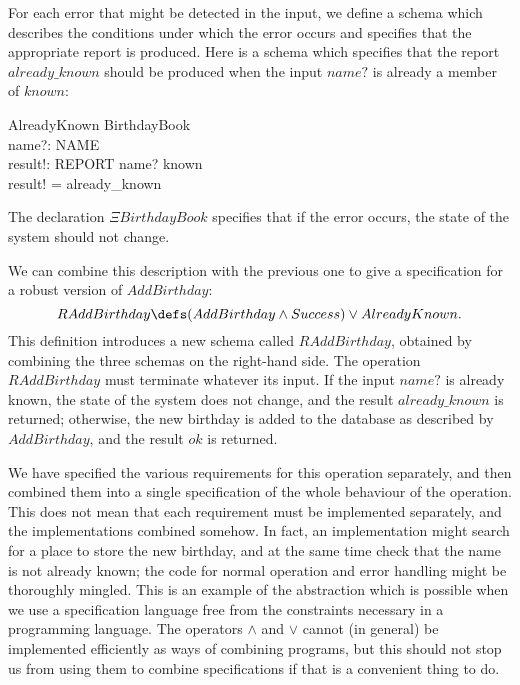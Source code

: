 \documentclass{llncs}
\begin{document}
For each error that might be detected in the input, we define a schema
which describes the conditions under which the error occurs and
specifies that the appropriate report is produced. Here is a schema
which specifies that the report $already\_known$ should be produced
when the input $name?$ is already a member of $known$:
\begin{schema}{AlreadyKnown}
	\Xi BirthdayBook \\
	name?: NAME \\
	result!: REPORT
\where
	name? \in known \\
	result! = already\_known
\end{schema}
The declaration $\Xi BirthdayBook$ specifies that if the error occurs,
the state of the system should not change.

We can combine this description with the previous one to give a
specification for a robust version of $AddBirthday$:
\[ RAddBirthday \defs (AddBirthday \land Success) \lor AlreadyKnown. \]
This definition introduces a new schema called $RAddBirthday$,
obtained by combining the three schemas on the right-hand side.
The operation $RAddBirthday$ must terminate whatever its input.  If
the input $name?$ is already known, the state of the system does not
change, and the result $already\_known$ is returned; otherwise,
the new birthday is added to the database as described by
$AddBirthday$, and the result $ok$ is returned.

We have specified the various requirements for this operation separately,
and then combined them into a single specification of the whole
behaviour of the operation. This does not mean that each requirement
must be implemented separately, and the implementations combined
somehow.
In fact, an implementation might search for a place to store the new
birthday, and at the same time check that the name is not already known;
the code for normal operation and error handling might be thoroughly
mingled.
This is an example of the abstraction which is possible when we use a
specification language free from the constraints necessary
in a programming language. The operators $\land$ and $\lor$
cannot (in general) be implemented efficiently as ways of combining
programs, but this should not stop us from using them to combine
specifications if that is a convenient thing to do.
\end{document}

